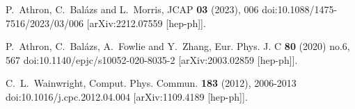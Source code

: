 P.~Athron, C.~Bal\'azs and L.~Morris,
JCAP \textbf{03} (2023), 006
doi:10.1088/1475-7516/2023/03/006
[arXiv:2212.07559 [hep-ph]].

P.~Athron, C.~Bal\'azs, A.~Fowlie and Y.~Zhang,
Eur. Phys. J. C \textbf{80} (2020) no.6, 567
doi:10.1140/epjc/s10052-020-8035-2
[arXiv:2003.02859 [hep-ph]].

C.~L.~Wainwright,
Comput. Phys. Commun. \textbf{183} (2012), 2006-2013
doi:10.1016/j.cpc.2012.04.004
[arXiv:1109.4189 [hep-ph]].


